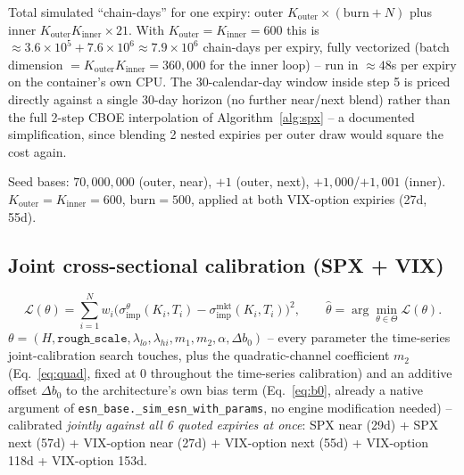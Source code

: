 \documentclass[11pt]{article}
\begin{document}
\begin{note}
Total simulated ``chain-days'' for one expiry: outer
$K_{\text{outer}}\times(\mathrm{burn}+N)$ plus inner
$K_{\text{outer}}K_{\text{inner}}\times21$. With
$K_{\text{outer}}=K_{\text{inner}}=600$ this is
$\approx3.6\times10^5+7.6\times10^6\approx7.9\times10^6$ chain-days per
expiry, fully vectorized (batch dimension $=K_{\text{outer}}K_{\text{inner}}=360{,}000$
for the inner loop) -- run in $\approx48$s per expiry on the
container's own CPU. The 30-calendar-day window inside step 5 is
priced directly against a single 30-day horizon (no further near/next
blend) rather than the full 2-step CBOE interpolation of
Algorithm~\ref{alg:spx} -- a documented simplification, since blending
2 nested expiries per outer draw would square the cost again.
\end{note}
Seed bases: $70{,}000{,}000$ (outer, near), $+1$ (outer, next),
$+1{,}000$/$+1{,}001$ (inner). $K_{\text{outer}}=K_{\text{inner}}=600$,
$\mathrm{burn}=500$, applied at both VIX-option expiries (27d, 55d).

\subsection{Joint cross-sectional calibration (SPX + VIX)}
\label{sec:jointcalib}

\begin{equation}
\mathcal L(\theta) = \sum_{i=1}^N w_i\Big(\sigma_{\text{imp}}^\theta(K_i,T_i)-\sigma_{\text{imp}}^{\text{mkt}}(K_i,T_i)\Big)^2,
\qquad
\hat\theta = \arg\min_{\theta\in\Theta}\mathcal L(\theta).
\label{eq:calibobj}
\end{equation}
$\theta=(H,\texttt{rough\_scale},\lambda_{lo},\lambda_{hi},m_1,m_2,\alpha,\Delta b_0)$
-- every parameter the time-series joint-calibration search touches,
plus the quadratic-channel coefficient $m_2$ (Eq.~\eqref{eq:quad},
fixed at $0$ throughout the time-series calibration) and an additive
offset $\Delta b_0$ to the architecture's own bias term
(Eq.~\eqref{eq:b0}, already a native argument of
\texttt{esn\_base.\_sim\_esn\_with\_params}, no engine modification
needed) -- calibrated \emph{jointly against all 6 quoted expiries at
once}: SPX near (29d) + SPX next (57d) + VIX-option near (27d) +
VIX-option next (55d) + VIX-option 118d + VIX-option 153d.
\end{document}
